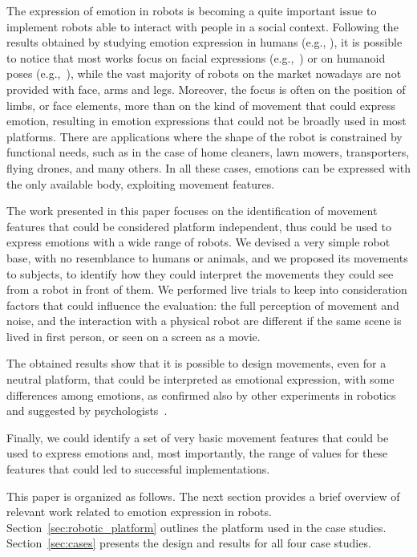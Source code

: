 The expression of emotion in robots is becoming a quite important issue to implement robots able to interact with people in a social context. Following the results obtained by studying emotion expression in humans (e.g., \cite{Venture2014,Ekman2004}), it is possible to notice that most works focus on facial expressions (e.g.,~\cite{Breazeal2002}) or on humanoid poses (e.g.,~\cite{Canamero2010}), while the vast majority of robots on the market nowadays are not provided with face, arms and legs. Moreover, the focus is often on the position of limbs, or face elements, more than on the kind of movement that could express emotion, resulting in emotion expressions that could not be broadly used in most platforms.
There are applications where the shape of the robot is constrained by functional needs, such as in the case of home cleaners, lawn mowers, transporters, flying drones, and many others. In all these cases, emotions can be expressed with the only available body, exploiting movement features.

The work presented in this paper focuses on the identification of movement features that could be considered platform independent, thus could be used to express emotions with a wide range of robots. We devised a very simple robot base, with no resemblance to humans or animals, and we proposed its movements to subjects, to identify how they could interpret the movements they could see from a robot in front of them. We performed live trials to keep into consideration factors that could influence the evaluation: the full perception of movement and noise, and the interaction with a physical robot are different if the same scene is lived in first person, or seen on a screen as a movie.

The obtained results show that it is possible to design movements, even for a neutral platform, that could be interpreted as emotional expression, with some differences among emotions, as confirmed also by other experiments in robotics~\cite{Sharma2013} and suggested by psychologists~\cite{Russell2003}.

Finally, we could identify a set of very basic movement features that could be used to express emotions and, most importantly, the range of values for these features that could led to successful implementations.

This paper is organized as follows. The next section provides a brief overview of relevant work related to emotion expression in robots. Section~\ref{sec:robotic_platform} outlines the platform used in the case studies. Section~\ref{sec:cases} presents the design and results for all four case studies.
